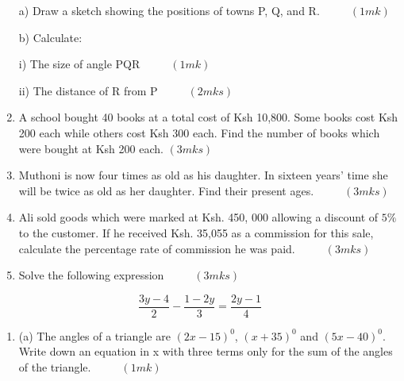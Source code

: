 \documentclass[
  a4paperpaper,
]{scrbook}
\begin{document}
\begin{tcolorbox}
\begin{enumerate}
  a) Draw a sketch showing the positions of towns P, Q, and R.
  \(\hspace{1cm} (1mk)\)

  b) Calculate:

  i) The size of angle PQR \(\hspace{1cm} (1mk)\)

  ii) The distance of R from P \(\hspace{1cm} (2mks)\)
\item
  A school bought 40 books at a total cost of Ksh 10,800. Some books
  cost Ksh 200 each while others cost Ksh 300 each. Find the number of
  books which were bought at Ksh 200 each. \((3mks)\)
\item
  Muthoni is now four times as old as his daughter. In sixteen years'
  time she will be twice as old as her daughter. Find their present
  ages. \(\hspace{1cm} (3mks)\)
\item
  Ali sold goods which were marked at Ksh. 450, 000 allowing a discount
  of \(5\%\) to the customer. If he received Ksh. 35,055 as a commission
  for this sale, calculate the percentage rate of commission he was
  paid. \(\hspace{1cm} (3mks)\)
\item
  Solve the following expression \(\hspace{1cm} (3mks)\)
\end{enumerate}

\[\frac{3y-4}{2}-\frac{1-2y}{3}=\frac{2y-1}{4}\]

\begin{enumerate}
\def\labelenumi{\arabic{enumi}.}
\setcounter{enumi}{10}
\item
  (a) The angles of a triangle are \((2x-15)^0\), \((x+35)^0\) and
  \((5x-40)^0\). Write down an equation in x with three terms only for
  the sum of the angles of the triangle. \(\hspace{1cm} (1mk)\)


\end{enumerate}
\end{tcolorbox}
\end{document}
